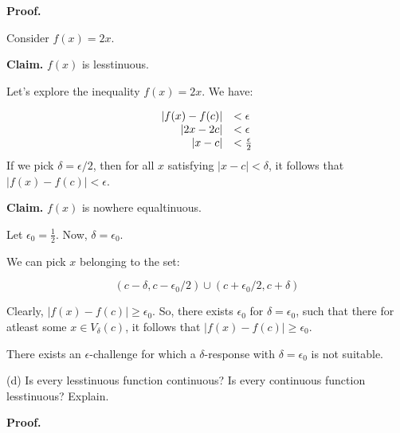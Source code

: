 \documentclass[10pt]{article}
\begin{document}
\textbf{Proof.}



Consider $\displaystyle f( x) =2x$.



\textbf{Claim.} $\displaystyle f( x)$ is lesstinuous.



Let's explore the inequality $\displaystyle f( x) =2x$. We have:


\begin{equation*}
\begin{array}{ r l }
|f( x) -f( c) | & < \epsilon \\
|2x-2c| & < \epsilon \\
|x-c| & < \frac{\epsilon }{2}
\end{array}
\end{equation*}
If we pick $\displaystyle \delta =\epsilon /2$, then for all $\displaystyle x$ satisfying $\displaystyle |x-c|< \delta $, it follows that $\displaystyle |f( x) -f( c) |< \epsilon $.



\textbf{Claim. }$\displaystyle f( x)$ is nowhere equaltinuous.



Let $\displaystyle \epsilon _{0} =\frac{1}{2}$. Now, $\displaystyle \delta =\epsilon _{0}$.



We can pick $\displaystyle x$ belonging to the set:


\begin{equation*}
( c-\delta ,c-\epsilon _{0} /2) \cup ( c+\epsilon _{0} /2,c+\delta )
\end{equation*}


Clearly, $\displaystyle |f( x) -f( c) |\geq \epsilon _{0}$. So, there exists $\displaystyle \epsilon _{0}$ for $\displaystyle \delta =\epsilon _{0}$, such that there for atleast some $\displaystyle x\in V_{\delta }( c)$, it follows that $\displaystyle |f( x) -f( c) |\geq \epsilon _{0}$. 



There exists an $\displaystyle \epsilon $-challenge for which a $\displaystyle \delta $-response with $\displaystyle \delta =\epsilon _{0}$ is not suitable.



(d) Is every lesstinuous function continuous? Is every continuous function lesstinuous? Explain.



\textbf{Proof.}
\end{document}
